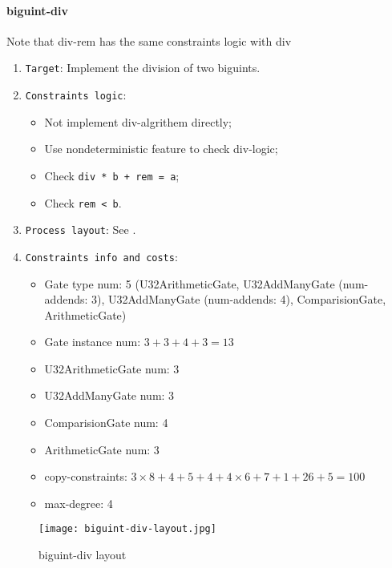 \paragraph{biguint-div}
\hspace*{\fill}

Note that div-rem has the same constraints logic with div

\begin{enumerate}
    \item \verb|Target|: Implement the division of two biguints.
    \item \verb|Constraints logic|:
    \begin{itemize}
        \item Not implement div-algrithem directly;
        \item Use nondeterministic feature to check div-logic;
        \item Check \verb|div * b + rem = a|;
        \item Check \verb|rem < b|.
    \end{itemize}
    \item \verb|Process layout|: See .
    \item \verb|Constraints info and costs|:
    \begin{itemize}
        \item Gate type num: 5 (U32ArithmeticGate, U32AddManyGate (num-addends: 3), U32AddManyGate (num-addends: 4), ComparisionGate, ArithmeticGate)
        \item Gate instance num: $3 + 3 + 4 + 3 = 13$
        \item U32ArithmeticGate num: 3
        \item U32AddManyGate num: 3
        \item ComparisionGate num: 4
        \item ArithmeticGate num: 3
        \item copy-constraints: $3 \times 8 + 4 + 5 + 4 + 4 \times 6 + 7 + 1 + 26 + 5 = 100$
        \item max-degree: 4
    \end{itemize}
\end{enumerate}

\begin{figure}[!ht]
    \centering
    \texttt{[image: biguint-div-layout.jpg]}
    \caption{biguint-div layout}
    \label{fig:biguint-div-layout}
\end{figure}